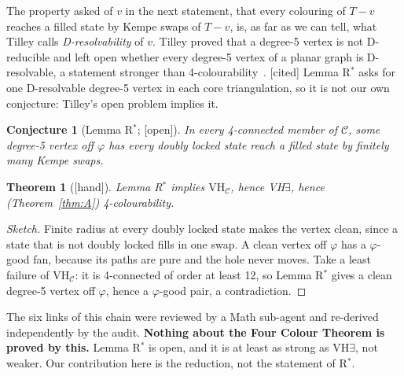 \documentclass[11pt]{article}
\newtheorem{theorem}{Theorem}\newtheorem{lemma}{Lemma}\newtheorem{conjecture}{Conjecture}
\newcommand{\lab}[1]{\textsf{[#1]}}
\begin{document}
The property asked of $v$ in the next statement, that every colouring of $T-v$ reaches a filled state by Kempe swaps of $T-v$, is, as far as we can tell, what Tilley calls \emph{D-resolvability} of $v$. Tilley proved that a degree-5 vertex is not D-reducible and left open whether every degree-5 vertex of a planar graph is D-resolvable, a statement stronger than 4-colourability~\cite{tilley2017}. \lab{cited} Lemma R$^\ast$ asks for one D-resolvable degree-5 vertex in each core triangulation, so it is not our own conjecture: Tilley's open problem implies it.
\begin{conjecture}[Lemma R$^\ast$; \lab{open}]
In every 4-connected member of $\mathcal C$, some degree-5 vertex off $\varphi$ has every doubly locked state reach a filled state by finitely many Kempe swaps.
\end{conjecture}
\begin{theorem}[\lab{hand}]\label{thm:chain}
Lemma R$^\ast$ implies $\mathrm{VH}_{\mathcal C}$, hence VH$\exists$, hence (Theorem~\ref{thm:A}) 4-colourability.
\end{theorem}
\begin{proof}[Sketch]
Finite radius at every doubly locked state makes the vertex clean, since a state that is not doubly locked fills in one swap. A clean vertex off $\varphi$ has a $\varphi$-good fan, because its paths are pure and the hole never moves. Take a least failure of $\mathrm{VH}_{\mathcal C}$: it is 4-connected of order at least 12, so Lemma R$^\ast$ gives a clean degree-5 vertex off $\varphi$, hence a $\varphi$-good pair, a contradiction.
\end{proof}
The six links of this chain were reviewed by a Math sub-agent and re-derived independently by the audit. \textbf{Nothing about the Four Colour Theorem is proved by this.} Lemma R$^\ast$ is open, and it is at least as strong as VH$\exists$, not weaker. Our contribution here is the reduction, not the statement of R$^\ast$.
\end{document}
